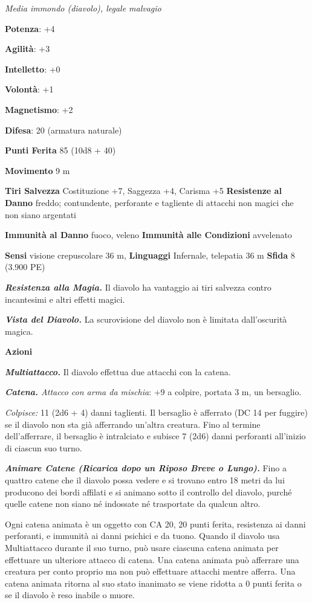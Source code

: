 \begin{multicols}{2}
\emph{Media immondo (diavolo), legale malvagio}

\textbf{Potenza}: +4

\textbf{Agilità}: +3

\textbf{Intelletto}: +0

\textbf{Volontà}: +1

\textbf{Magnetismo}: +2

\textbf{Difesa}: 20 (armatura naturale)

\textbf{Punti Ferita} 85 (10d8 + 40)

\textbf{Movimento} 9 m

\textbf{Tiri Salvezza} Costituzione +7, Saggezza +4, Carisma +5
\textbf{Resistenze al Danno} freddo; contundente, perforante e tagliente
di attacchi non magici che non siano argentati

\textbf{Immunità al Danno} fuoco, veleno \textbf{Immunità alle
Condizioni} avvelenato

\textbf{Sensi} visione crepuscolare 36 m, 
\textbf{Linguaggi} Infernale, telepatia 36 m \textbf{Sfida} 8 (3.900 PE)

\emph{\textbf{Resistenza alla Magia.}} Il diavolo ha vantaggio ai tiri
salvezza contro incantesimi e altri effetti magici.

\emph{\textbf{Vista del Diavolo.}} La scurovisione del diavolo non è
limitata dall'oscurità magica.

\textbf{Azioni}

\emph{\textbf{Multiattacco.}} Il diavolo effettua due attacchi con la
catena.

\emph{\textbf{Catena.} Attacco con arma da mischia}: +9 a colpire,
portata 3 m, un bersaglio.

\emph{Colpisce:} 11 (2d6 + 4) danni taglienti. Il bersaglio è afferrato
(DC 14 per fuggire) se il diavolo non sta già afferrando un'altra
creatura. Fino al termine dell'afferrare, il bersaglio è intralciato e
subisce 7 (2d6) danni perforanti all'inizio di ciascun suo turno.

\emph{\textbf{Animare Catene (Ricarica dopo un Riposo Breve o Lungo).}}
Fino a quattro catene che il diavolo possa vedere e si trovano entro 18
metri da lui producono dei bordi affilati e si animano sotto il
controllo del diavolo, purché quelle catene non siano né indossate né
trasportate da qualcun altro.

Ogni catena animata è un oggetto con CA 20, 20 punti ferita, resistenza
ai danni perforanti, e immunità ai danni psichici e da tuono. Quando il
diavolo usa Multiattacco durante il suo turno, può usare ciascuna catena
animata per effettuare un ulteriore attacco di catena. Una catena
animata può afferrare una creatura per conto proprio ma non può
effettuare attacchi mentre afferra. Una catena animata ritorna al suo
stato inanimato se viene ridotta a 0 punti ferita o se il diavolo è reso
inabile o muore.


\end{multicols}
